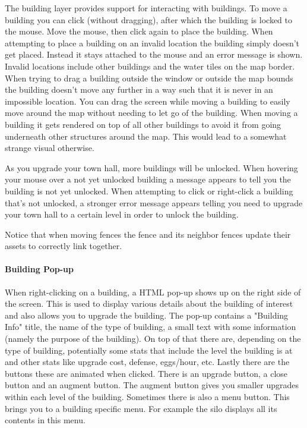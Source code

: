 \documentclass[12pt]{article}
\begin{document}
The building layer provides support for interacting with buildings. To move a building you can click (without dragging),
after which the building is locked to the mouse. Move the mouse, then click again to place the building. When attempting
to place a building on an invalid location the building simply doesn't get placed. Instead it stays attached to the mouse and an error message is shown.
Invalid locations include other buildings and the water tiles on the map border. When trying to drag a building outside the window or outside
the map bounds the building doesn't move any further in a way such that it is never in an impossible location. You can
drag the screen while moving a building to easily move around the map without needing to let go of the building. When moving a building it gets rendered on top of all other buildings to avoid it from going underneath other structures
around the map. This would lead to a somewhat strange visual otherwise.

As you upgrade your town hall, more buildings will be unlocked. When hovering your mouse over a not yet unlocked building a message appears to tell you the building is not yet unlocked. When attempting to click or right-click a building that's not unlocked, a stronger error message appears telling you need to upgrade your town hall to a certain level in order to unlock the building.

Notice that when moving fences the fence and its neighbor fences update their assets to correctly link together.

\paragraph{Building Pop-up} When right-clicking on a building, a HTML pop-up shows up on the right side of the screen.
This is used to display various details about the building of interest and also allows you to upgrade the building. The
pop-up contains a "Building Info" title, the name of the type of building, a small text with some information (namely
the purpose of the building). On top of that there are, depending on the type of building, potentially some stats that
include the level the building is at and other stats like upgrade cost, defense, eggs/hour, etc. Lastly there are the buttons these are animated when clicked. There is an upgrade button, a close button and an augment button. The augment button gives you smaller upgrades within each level of the building. Sometimes there is also a menu button. This brings you to a building specific menu. For example the silo displays all its contents in this menu.
\end{document}
